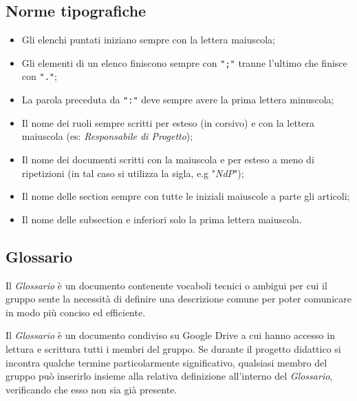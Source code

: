 \subsection{Norme tipografiche}
\begin{itemize}
    \item Gli elenchi puntati iniziano sempre con la lettera maiuscola;
    \item Gli elementi di un elenco finiscono sempre con \texttt{";"} tranne l'ultimo che finisce con \texttt{"."};
    \item La parola preceduta da \texttt{":"} deve sempre avere la prima lettera minuscola;
    \item Il nome dei ruoli sempre scritti per esteso (in corsivo) e con la lettera maiuscola (es: \textit{Responsabile di Progetto});
    \item Il nome dei documenti scritti con la maiuscola e per esteso a meno di ripetizioni (in tal caso si utilizza la sigla, e.g "\textit{NdP}");
    \item Il nome delle section sempre con tutte le iniziali maiuscole a parte gli articoli;
    \item Il nome delle subsection e inferiori solo la prima lettera maiuscola.
\end{itemize}
\subsection{Glossario}
Il \textit{Glossario} è un documento contenente vocaboli tecnici o ambigui per cui il gruppo sente la necessità di definire una descrizione comune per poter comunicare in modo più conciso ed efficiente.

Il \textit{Glossario} è un documento condiviso su Google Drive a cui hanno accesso in lettura e scrittura tutti i membri del gruppo. Se durante il progetto didattico si incontra qualche termine particolarmente significativo, qualsiasi membro del gruppo può inserirlo insieme alla relativa definizione all'interno del \textit{Glossario}, verificando che esso non sia già presente.

